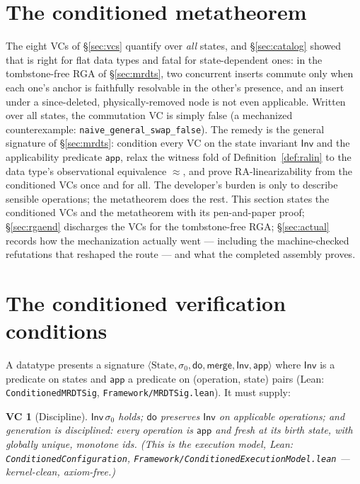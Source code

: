 \documentclass[11pt]{article}
\newtheorem{vc}{VC}
\newcommand{\lean}[1]{\texttt{#1}}
\newcommand{\st}{\sigma}
\newcommand{\ini}{\st_0}
\newcommand{\dodo}{\mathsf{do}}
\newcommand{\merge}{\mathsf{merge}}
\newcommand{\eqobs}{\approx}
\newcommand{\Inv}{\mathsf{Inv}}
\newcommand{\app}{\mathsf{app}}
\begin{document}
\section{The conditioned metatheorem}
\label{sec:condmeta}

The eight VCs of \S\ref{sec:vcs} quantify over \emph{all} states, and
\S\ref{sec:catalog} showed that is right for flat data types and fatal
for state-dependent ones: in the tombstone-free RGA of
\S\ref{sec:mrdts}, two concurrent inserts commute only when each one's
anchor is faithfully resolvable in the other's presence, and an insert
under a since-deleted, physically-removed node is not even applicable.
Written over all states, the commutation VC is simply false (a mechanized
counterexample: \lean{naive\_general\_swap\_false}). The remedy is the
general signature of \S\ref{sec:mrdts}: condition every VC on the state
invariant $\Inv$ and the applicability predicate $\app$, relax the
witness fold of Definition~\ref{def:ralin} to the data type's
observational equivalence $\eqobs$, and prove RA-linearizability from the
conditioned VCs once and for all. The developer's burden is only to
describe sensible operations; the metatheorem does the rest. This section
states the conditioned VCs and the metatheorem with its pen-and-paper
proof; \S\ref{sec:rgaend} discharges the VCs for the tombstone-free RGA;
\S\ref{sec:actual} records how the mechanization actually went ---
including the machine-checked refutations that reshaped the route --- and
what the completed assembly proves.

\section{The conditioned verification conditions}\label{sec:cvcs}

A datatype presents a signature
$\langle \text{State}, \ini, \dodo, \merge, \Inv, \app \rangle$ where $\Inv$ is a predicate
on states and $\app$ a predicate on (operation, state) pairs (Lean:
\lean{ConditionedMRDTSig}, \lean{Framework/MRDTSig.lean}). It must supply:

\begin{vc}[Discipline]\label{vc:disc}
$\Inv\,\ini$ holds; $\dodo$ preserves $\Inv$ on applicable operations; and generation is
disciplined: every operation is $\app$ and \emph{fresh} at its birth state, with globally
unique, monotone ids. (This is the execution model, Lean:
\lean{ConditionedConfiguration}, \lean{Framework/ConditionedExecutionModel.lean} --- kernel-clean,
axiom-free.)
\end{vc}
\end{document}
